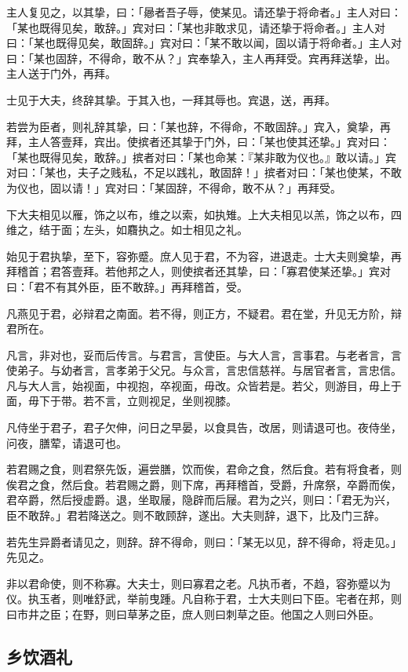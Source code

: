 \documentclass[]{article}
\begin{document}
主人复见之，以其挚，曰：「曏者吾子辱，使某见。请还挚于将命者。」主人对曰：「某也既得见矣，敢辞。」宾对曰：「某也非敢求见，请还挚于将命者。」主人对曰：「某也既得见矣，敢固辞。」宾对曰：「某不敢以闻，固以请于将命者。」主人对曰：「某也固辞，不得命，敢不从？」宾奉挚入，主人再拜受。宾再拜送挚，出。主人送于门外，再拜。

士见于大夫，终辞其挚。于其入也，一拜其辱也。宾退，送，再拜。

若尝为臣者，则礼辞其挚，曰：「某也辞，不得命，不敢固辞。」宾入，奠挚，再拜，主人答壹拜，宾出。使摈者还其挚于门外，曰：「某也使其还挚。」宾对曰：「某也既得见矣，敢辞。」摈者对曰：「某也命某：『某非敢为仪也。』敢以请。」宾对曰：「某也，夫子之贱私，不足以践礼，敢固辞！」摈者对曰：「某也使某，不敢为仪也，固以请！」宾对曰：「某固辞，不得命，敢不从？」再拜受。

下大夫相见以雁，饰之以布，维之以索，如执雉。上大夫相见以羔，饰之以布，四维之，结于面；左头，如麛执之。如士相见之礼。

始见于君执挚，至下，容弥蹙。庶人见于君，不为容，进退走。士大夫则奠挚，再拜稽首；君答壹拜。若他邦之人，则使摈者还其挚，曰：「寡君使某还挚。」宾对曰：「君不有其外臣，臣不敢辞。」再拜稽首，受。

凡燕见于君，必辩君之南面。若不得，则正方，不疑君。君在堂，升见无方阶，辩君所在。

凡言，非对也，妥而后传言。与君言，言使臣。与大人言，言事君。与老者言，言使弟子。与幼者言，言孝弟于父兄。与众言，言忠信慈祥。与居官者言，言忠信。凡与大人言，始视面，中视抱，卒视面，毋改。众皆若是。若父，则游目，毋上于面，毋下于带。若不言，立则视足，坐则视膝。

凡侍坐于君子，君子欠伸，问日之早晏，以食具告，改居，则请退可也。夜侍坐，问夜，膳荤，请退可也。

若君赐之食，则君祭先饭，遍尝膳，饮而俟，君命之食，然后食。若有将食者，则俟君之食，然后食。若君赐之爵，则下席，再拜稽首，受爵，升席祭，卒爵而俟，君卒爵，然后授虚爵。退，坐取屦，隐辟而后屦。君为之兴，则曰：「君无为兴，臣不敢辞。」君若降送之。则不敢顾辞，遂出。大夫则辞，退下，比及门三辞。

若先生异爵者请见之，则辞。辞不得命，则曰：「某无以见，辞不得命，将走见。」先见之。

非以君命使，则不称寡。大夫士，则曰寡君之老。凡执币者，不趋，容弥蹙以为仪。执玉者，则唯舒武，举前曳踵。凡自称于君，士大夫则曰下臣。宅者在邦，则曰市井之臣；在野，则曰草茅之臣，庶人则曰刺草之臣。他国之人则曰外臣。

\hypertarget{header-n24}{%
\subsection{乡饮酒礼}\label{header-n24}}
\end{document}
